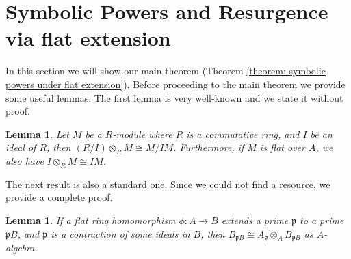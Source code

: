 \documentclass[12pt]{amsart}
\numberwithin{equation}{section}
\newtheorem{lemma}[theorem]{Lemma}
\theoremstyle{definition}
\begin{document}
	

\section{Symbolic Powers and Resurgence via flat extension}\label{section: Resurgence via prime extension}
	In this section we will show our main theorem (Theorem \ref{theorem: symbolic powers under flat extension}). Before proceeding to the main theorem we provide some useful lemmas. The first lemma is very well-known and we state it without proof. 
	\begin{lemma}\label{lemma: extension of an ideal}
		Let $M$ be a $R$-module where $R$ is a commutative ring, and $I$ be an ideal of $R$, then $(R/I) \otimes_R M \cong M/IM$. Furthermore, if $M$ is flat over $A$, we also have $I \otimes_R M \cong IM$.
	\end{lemma}
	
	
The next result is also a standard one. Since we could not find a resource, we provide a complete proof. 
	
	\begin{lemma}\label{lemma: tensor of localization}
	If a flat ring homomorphism $\phi: A\to B$ extends a prime $\mathfrak{p}$ to a prime $\mathfrak{p}B$, and $\mathfrak{p}$ is a contraction of some ideals in $B$, then $B_{\mathfrak{p}B} \cong A_{\mathfrak{p}} \otimes_A B_{\mathfrak{p}B}$ as $A$-algebra.
	\end{lemma}
	
\end{document}
